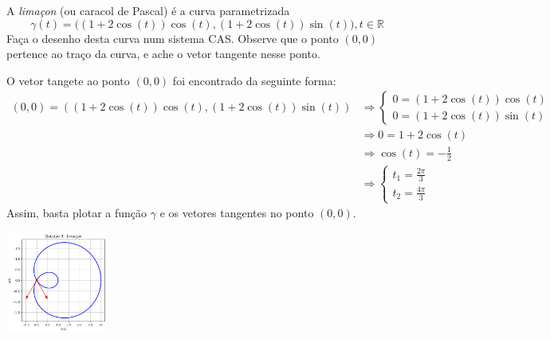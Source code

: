 \documentclass[../main.tex]{subfiles}
\begin{document}
	\begin{exercicio}{3}
		A \textit{limaçon} (ou caracol de Pascal) é a curva parametrizada
		\[
		\gamma(t)=\bigg((1+2\cos(t))\cos(t), (1+2\cos(t))\sin(t)\bigg), t\in \mathbb{R}
		\]
		Faça o desenho desta curva num sistema CAS. Observe que o ponto $(0,0)$ pertence ao traço da curva, e ache o vetor tangente nesse ponto.
	\end{exercicio}
	\begin{solucao}
		O vetor tangete ao ponto $(0,0)$ foi encontrado da seguinte forma:
		\begin{align*}
			(0,0)=((1+2\cos(t))\cos(t),(1+2\cos(t))\sin(t))
			&\Rightarrow \begin{cases}0=(1+2\cos(t))\cos(t) \\0=(1+2\cos(t))\sin(t) \end{cases}\\
			&\Rightarrow 0=1+2\cos(t)\\
			&\Rightarrow \cos(t)=-\frac{1}{2}\\
			&\Rightarrow \begin{cases} t_{1}=\frac{2\pi}{3} \\ t_{2}=\frac{4\pi}{3} \end{cases}
		\end{align*}
		Assim, basta plotar a função $\gamma$ e os vetores tangentes no ponto $(0,0)$.
		\begin{center}
			\includegraphics[width=0.25\textwidth]{imagens/lista01/picture_lista01_q03.png}
		\end{center}
	\end{solucao}
	
\end{document}
